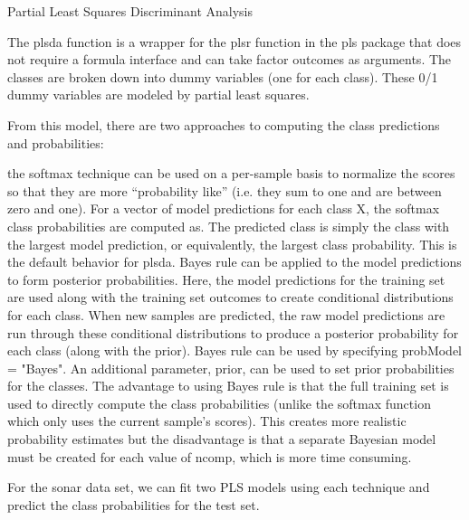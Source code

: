 \documentclass[caret-main.tex]{subfiles}
\begin{document}
Partial Least Squares Discriminant Analysis

The plsda function is a wrapper for the plsr function in the pls package that does not require a formula interface and can take factor outcomes as arguments. The classes are broken down into dummy variables (one for each class). These 0/1 dummy variables are modeled by partial least squares.

From this model, there are two approaches to computing the class predictions and probabilities:

the softmax technique can be used on a per-sample basis to normalize the scores so that they are more ``probability like'' (i.e. they sum to one and are between zero and one). For a vector of model predictions for each class X, the softmax class probabilities are computed as. The predicted class is simply the class with the largest model prediction, or equivalently, the largest class probability. This is the default behavior for plsda.
Bayes rule can be applied to the model predictions to form posterior probabilities. Here, the model predictions for the training set are used along with the training set outcomes to create conditional distributions for each class. When new samples are predicted, the raw model predictions are run through these conditional distributions to produce a posterior probability for each class (along with the prior). Bayes rule can be used by specifying probModel = "Bayes". An additional parameter, prior, can be used to set prior probabilities for the classes.
The advantage to using Bayes rule is that the full training set is used to directly compute the class probabilities (unlike the softmax function which only uses the current sample's scores). 
This creates more realistic probability estimates but the disadvantage is that a separate Bayesian model must be created for each value of ncomp, which is more time consuming.

For the sonar data set, we can fit two PLS models using each technique and predict the class probabilities 
for the test set.
\end{document}
